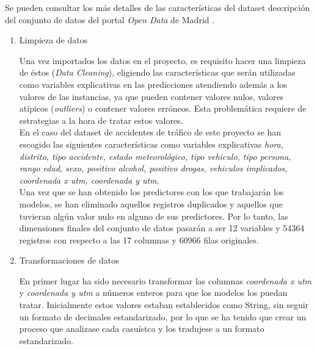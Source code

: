 \begin{enumerate}
\begin{table}[h]
            \end{table}


            Se pueden consultar los más detalles de las características del dataset descripción del conjunto de datos del portal \textit{Open Data} de Madrid \cite{InfoDatasetMadrid}.\\


            \begin{enumerate}

                \item Limpieza de datos

                    Una vez importados los datos en el proyecto, es requisito hacer una limpieza de éstos (\textit{Data Cleaning}), eligiendo las características que serán utilizadas como variables explicativas en las predicciones atendiendo además a los valores de las instancias, ya que pueden contener valores nulos, valores atípicos (\textit{outliers}) o contener valores erróneos. Esta problemática requiere de estrategias a la hora de tratar estos valores.\\

                    En el caso del dataset de accidentes de tráfico de este proyecto se han escogido las siguientes características como variables explicativas \textit{hora, distrito, tipo accidente, estado meteorológico, tipo vehiculo, tipo persona, rango edad, sexo, positivo alcohol, positivo drogas, vehiculos implicados, coordenada x utm, coordenada y utm}.\\


                    Una vez que se han obtenido los predictores con los que trabajarán los modelos, se han eliminado aquellos registros duplicados y aquellos que tuvieran algún valor nulo en alguno de sus predictores. Por lo tanto, las dimensiones finales del conjunto de datos pasarán a ser 12 variables y 54364 registros con respecto a las 17 columnas y 60966 filas originales.\\



                \item Transformaciones de datos


                    En primer lugar ha sido necesario transformar las columnas \textit{coordenada x utm} y \textit{coordenada y utm} a números enteros para que los modelos los puedan tratar. Inicialmente estos valores estaban establecidos como String, sin seguir un formato de decimales estandarizado, por lo que se ha tenido que crear un proceso que analizase cada casuístca y los tradujese a un formato estandarizado.



\end{enumerate}
\end{enumerate}
